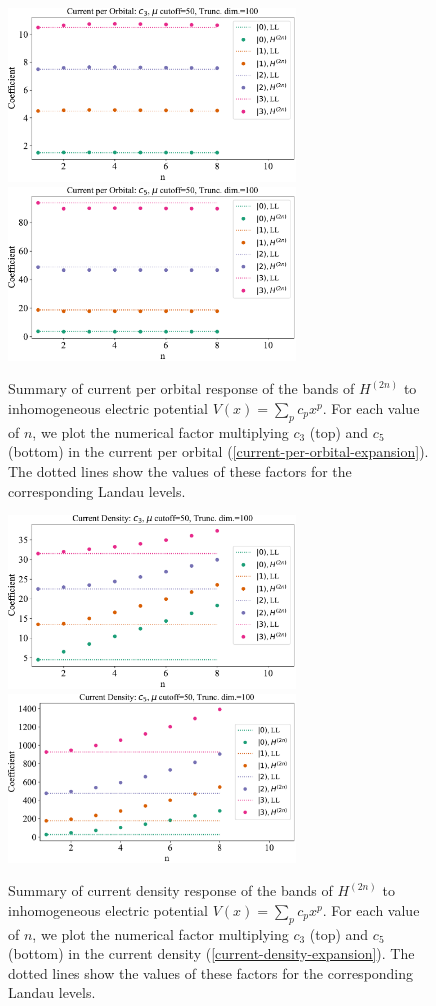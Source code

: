 \documentclass[aps,prb,twocolumn,letterpaper,twoside,nobalancelastpage,groupedaddress,amsmath,amssymb,floatfix,citeautoscript]{revtex4-1}
\begin{document}
\begin{figure}[tb]
\includegraphics[width=3.0in]{current-orbital-c3.pdf}
\includegraphics[width=3.0in]{current-orbital-c5.pdf}
\caption{\label{plot-current-per-orbital} Summary of current per orbital response of the bands of $H^{(2n)}$ to inhomogeneous electric potential $V(x) = \sum_p c_p x^p$. For each value of $n$, we plot the numerical factor multiplying $c_3$ (top) and $c_5$ (bottom) in the current per orbital (\ref{current-per-orbital-expansion}). The dotted lines show the values of these factors for the corresponding Landau levels.}
\end{figure}

\begin{figure}[tb]
\includegraphics[width=3.0in]{current-density-c3-tight.pdf}
\includegraphics[width=3.0in]{current-density-c5-tight.pdf}
\caption{\label{plot-current-density}Summary of current density response of the bands of $H^{(2n)}$ to inhomogeneous electric potential $V(x) = \sum_p c_p x^p$. For each value of $n$, we plot the numerical factor multiplying $c_3$ (top) and $c_5$ (bottom) in the current density (\ref{current-density-expansion}). The dotted lines show the values of these factors for the corresponding Landau levels.}
\end{figure}
\end{document}
